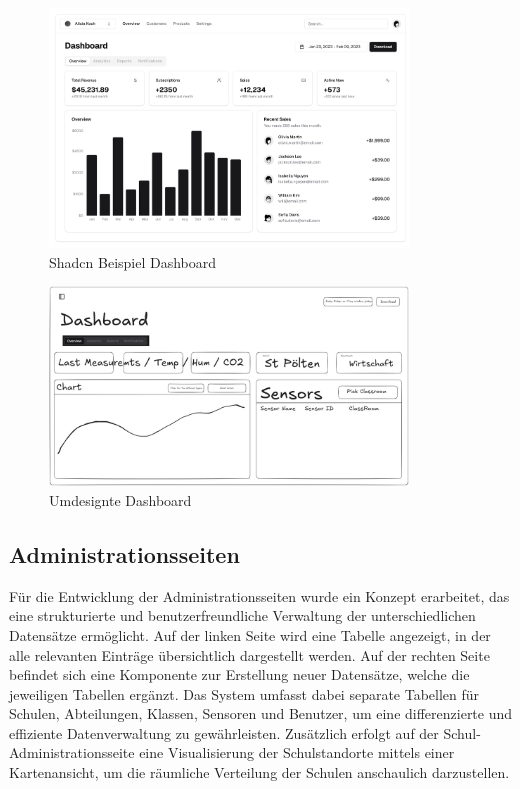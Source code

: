 \begin{inhalt}
\begin{figure}[!htb] 
\centering 
\includegraphics[width=0.85\textwidth]{files/Thomas/pics/Design-Grundlagen/Frontend/Dashboard/dashboard.png} 
\caption[Shadcn Beispiel Dashboard]{Shadcn Beispiel Dashboard} 
\label{fig:gehaeuse_internet_bild} 
\end{figure}

\vspace{-0.5cm}

\begin{figure}[!htb] 
\centering 
\includegraphics[width=0.85\textwidth]{files/Thomas/pics/Design-Grundlagen/Frontend/Dashboard/Dashboard-Draw.png} 
\caption[Umdesignte Dashboard]{Umdesignte Dashboard} 
\label{fig:gehaeuse_internet_bild} 
\end{figure}

\newpage

\subsection{Administrationsseiten}
\label{ref:Administrationsseiten}

Für die Entwicklung der Administrationsseiten wurde ein Konzept erarbeitet, das eine strukturierte und benutzerfreundliche Verwaltung der unterschiedlichen Datensätze ermöglicht. Auf der linken Seite wird eine Tabelle angezeigt, in der alle relevanten Einträge übersichtlich dargestellt werden. Auf der rechten Seite befindet sich eine Komponente zur Erstellung neuer Datensätze, welche die jeweiligen Tabellen ergänzt. Das System umfasst dabei separate Tabellen für Schulen, Abteilungen, Klassen, Sensoren und Benutzer, um eine differenzierte und effiziente Datenverwaltung zu gewährleisten. Zusätzlich erfolgt auf der Schul-Administrationsseite eine Visualisierung der Schulstandorte mittels einer Kartenansicht, um die räumliche Verteilung der Schulen anschaulich darzustellen.


\end{inhalt}
